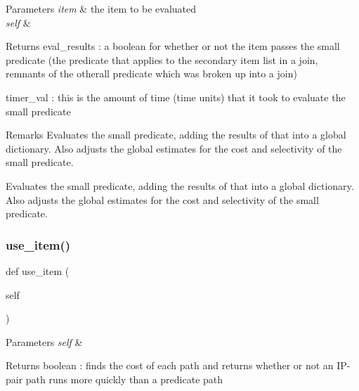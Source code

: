 \begin{DoxyParams}{Parameters}
{\em item} & the item to be evaluated \\
\hline
{\em self} & \\
\hline
\end{DoxyParams}
\begin{DoxyReturn}{Returns}
eval\+\_\+results \+: a boolean for whether or not the item passes the small predicate (the predicate that applies to the secondary item list in a join, remnants of the otherall predicate which was broken up into a join) 

timer\+\_\+val \+: this is the amount of time (time units) that it took to evaluate the small predicate 
\end{DoxyReturn}
\begin{DoxyRemark}{Remarks}
Evaluates the small predicate, adding the results of that into a global dictionary. Also adjusts the global estimates for the cost and selectivity of the small predicate.\begin{DoxyVerb}Evaluates the small predicate, adding the results of that into a global dictionary. 
Also adjusts the global estimates for the cost and selectivity of the small predicate.\end{DoxyVerb}
 
\end{DoxyRemark}
\mbox{\label{classdynamicfilterapp_1_1models_1_1_join_a53b3d6276057a6991b0e03cacb4818a9}} 
\subsubsection{\texorpdfstring{use\+\_\+item()}{use\_item()}}
{\footnotesize\ttfamily def use\+\_\+item (\begin{DoxyParamCaption}\item[{}]{self }\end{DoxyParamCaption})}


\begin{DoxyParams}{Parameters}
{\em self} & \\
\hline
\end{DoxyParams}
\begin{DoxyReturn}{Returns}
boolean \+: finds the cost of each path and returns whether or not an I\+P-\/pair path runs more quickly than a predicate path 
\end{DoxyReturn}


